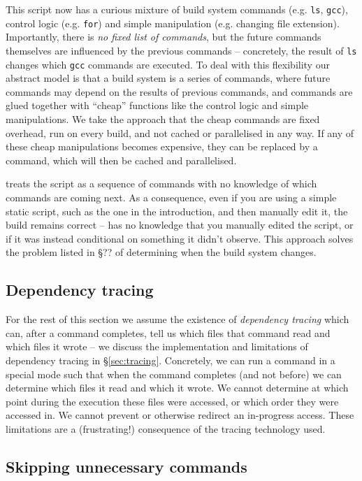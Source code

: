 This script now has a curious mixture of build system commands (e.g. \texttt{ls}, \texttt{gcc}), control logic (e.g. \texttt{for}) and simple manipulation (e.g. changing file extension). Importantly, there is \emph{no fixed list of commands}, but the future commands themselves are influenced by the previous commands -- concretely, the result of \texttt{ls} changes which \texttt{gcc} commands are executed. To deal with this flexibility our abstract model is that a build system is a series of commands, where future commands may depend on the results of previous commands, and commands are glued together with ``cheap'' functions like the control logic and simple manipulations. We take the approach that the cheap commands are fixed overhead, run on every build, and not cached or parallelised in any way. If any of these cheap manipulations becomes expensive, they can be replaced by a command, which will then be cached and parallelised.

\Rattle treats the script as a sequence of commands with no knowledge of which commands are coming next. As a consequence, even if you are using a simple static script, such as the one in the introduction, and then manually edit it, the \Rattle build remains correct -- \Rattle has no knowledge that you manually edited the script, or if it was instead conditional on something it didn't observe. This approach solves the problem listed in \cite{build_systems_a_la_carte} \S?? of determining when the build system changes.

\subsection{Dependency tracing}
\label{sec:assume_tracing}

For the rest of this section we assume the existence of \emph{dependency tracing} which can, after a command completes, tell us which files that command read and which files it wrote -- we discuss the implementation and limitations of dependency tracing in \S\ref{sec:tracing}. Concretely, we can run a command in a special mode such that when the command completes (and not before) we can determine which files it read and which it wrote. We cannot determine at which point during the execution these files were accessed, or which order they were accessed in. We cannot prevent or otherwise redirect an in-progress access. These limitations are a (frustrating!) consequence of the tracing technology used.

\subsection{Skipping unnecessary commands}
\label{sec:skipping_unnecessary}

